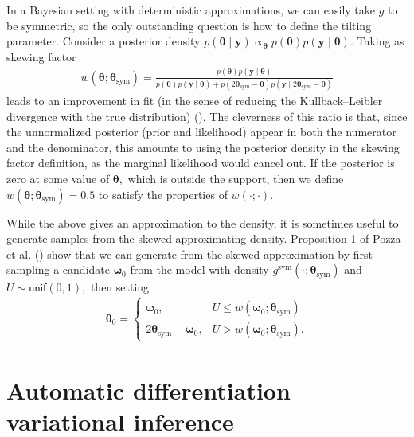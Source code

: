 \documentclass[
  11pt,
  letterpaper,
]{scrbook}
\theoremstyle{definition}
\theoremstyle{plain}
\theoremstyle{plain}
\theoremstyle{plain}
\theoremstyle{definition}
\theoremstyle{definition}
\theoremstyle{plain}
\theoremstyle{plain}
\theoremstyle{remark}
\begin{document}
In a Bayesian setting with deterministic approximations, we can easily
take \(g\) to be symmetric, so the only outstanding question is how to
define the tilting parameter. Consider a posterior density
\(p(\boldsymbol{\theta} \mid \boldsymbol{y}) \propto_{\boldsymbol{\theta}} p(\boldsymbol{\theta})p(\boldsymbol{y}\mid \boldsymbol{\theta}).\)
Taking as skewing factor \begin{align*}
w(\boldsymbol{\theta};\boldsymbol{\theta}_{\text{sym}}) = \frac{p(\boldsymbol{\theta})p(\boldsymbol{y}\mid \boldsymbol{\theta})}{p(\boldsymbol{\theta})p(\boldsymbol{y}\mid \boldsymbol{\theta}) + p(2\boldsymbol{\theta}_{\text{sym}} -\boldsymbol{\theta})p(\boldsymbol{y}\mid 2\boldsymbol{\theta}_{\text{sym}}-\boldsymbol{\theta})}
\end{align*} leads to an improvement in fit (in the sense of reducing
the Kullback--Leibler divergence with the true distribution)
(). The
cleverness of this ratio is that, since the unnormalized posterior
(prior and likelihood) appear in both the numerator and the denominator,
this amounts to using the posterior density in the skewing factor
definition, as the marginal likelihood would cancel out. If the
posterior is zero at some value of \(\boldsymbol{\theta},\) which is
outside the support, then we define
\(w(\boldsymbol{\theta};\boldsymbol{\theta}_{\text{sym}})=0.5\) to
satisfy the properties of \(w(\cdot;\cdot).\)

While the above gives an approximation to the density, it is sometimes
useful to generate samples from the skewed approximating density.
Proposition 1 of Pozza et al.
() show that we can
generate from the skewed approximation by first sampling a candidate
\(\boldsymbol{\omega}_0\) from the model with density
\(g^{\text{sym}}(\cdot; \boldsymbol{\theta}_{\text{sym}})\) and
\(U \sim \mathsf{unif}(0,1),\) then setting \begin{align*}
\boldsymbol{\theta}_0 = 
\begin{cases} 
\boldsymbol{\omega}_0, & 
U \leq w(\boldsymbol{\omega}_0; \boldsymbol{\theta}_{\text{sym}}) \\
2\boldsymbol{\theta}_{\text{sym}}-\boldsymbol{\omega}_0, & U > w(\boldsymbol{\omega}_0; \boldsymbol{\theta}_{\text{sym}}).
\end{cases}
\end{align*}

\section{Automatic differentiation variational
inference}\label{automatic-differentiation-variational-inference}
\end{document}
